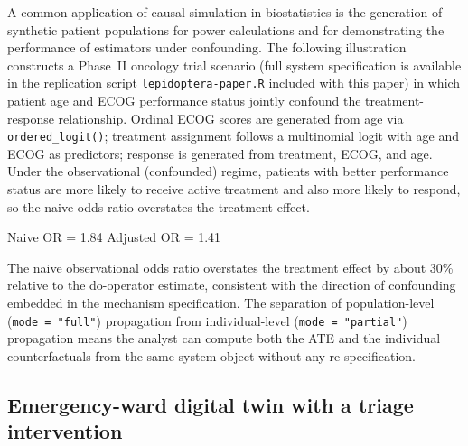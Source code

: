 \documentclass[12pt]{article}
\newcommand{\code}[1]{\texttt{#1}}
\newcommand{\fct}[1]{\texttt{#1()}}
\begin{document}
A common application of causal simulation in biostatistics is the generation of
synthetic patient populations for power calculations and for demonstrating the
performance of estimators under confounding. The following illustration constructs
a Phase~II oncology trial scenario (full system specification is available in the
replication script \code{lepidoptera-paper.R} included with this paper) in which patient age and ECOG performance status
jointly confound the treatment-response relationship. Ordinal ECOG scores are
generated from age via \fct{ordered\_logit}; treatment assignment follows a
multinomial logit with age and ECOG as predictors; response is generated from
treatment, ECOG, and age. Under the observational (confounded) regime, patients
with better performance status are more likely to receive active treatment and also
more likely to respond, so the naive odds ratio overstates the treatment effect.


\begin{CodeOutput}
Naive OR = 1.84   Adjusted OR = 1.41
\end{CodeOutput}

\noindent
The naive observational odds ratio overstates the treatment effect by about 30\%
relative to the do-operator estimate, consistent with the direction of confounding
embedded in the mechanism specification. The separation of population-level
(\code{mode = "full"}) propagation from individual-level (\code{mode = "partial"})
propagation means the analyst can compute both the ATE and the individual
counterfactuals from the same system object without any re-specification.

\subsection{Emergency-ward digital twin with a triage intervention}
\end{document}
